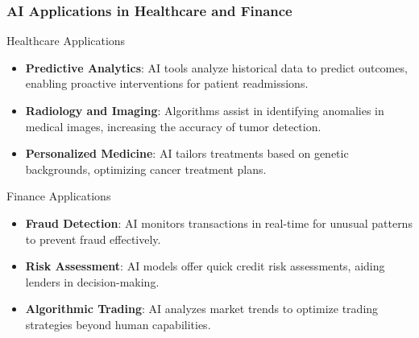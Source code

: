 \documentclass[aspectratio=169]{beamer}
\begin{document}
\begin{frame}[fragile]
    \frametitle{AI Applications in Healthcare and Finance}
    \begin{block}{Healthcare Applications}
        \begin{itemize}
            \item \textbf{Predictive Analytics}: AI tools analyze historical data to predict outcomes, enabling proactive interventions for patient readmissions.
            \item \textbf{Radiology and Imaging}: Algorithms assist in identifying anomalies in medical images, increasing the accuracy of tumor detection.
            \item \textbf{Personalized Medicine}: AI tailors treatments based on genetic backgrounds, optimizing cancer treatment plans.
        \end{itemize}
    \end{block}

    \begin{block}{Finance Applications}
        \begin{itemize}
            \item \textbf{Fraud Detection}: AI monitors transactions in real-time for unusual patterns to prevent fraud effectively.
            \item \textbf{Risk Assessment}: AI models offer quick credit risk assessments, aiding lenders in decision-making.
            \item \textbf{Algorithmic Trading}: AI analyzes market trends to optimize trading strategies beyond human capabilities.
        \end{itemize}
    \end{block}
\end{frame}
\end{document}
